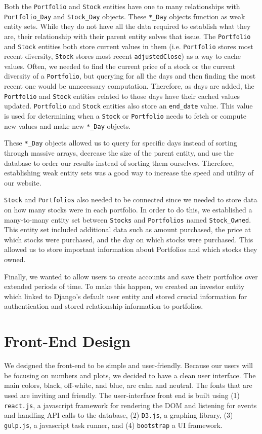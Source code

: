\documentclass{article}
\begin{document}
Both the \texttt{Portfolio} and \texttt{Stock} entities have one to many relationships with \texttt{Portfolio\_Day} and \texttt{Stock\_Day} objects. These \texttt{*\_Day} objects function as weak entity sets. While they do not have all the data required to establish what they are, their relationship with their parent entity solves that issue. The \texttt{Portfolio} and \texttt{Stock} entities both store current values in them (i.e. \texttt{Portfolio} stores most recent diversity, \texttt{Stock} stores most recent \texttt{adjustedClose}) as a way to cache values. Often, we needed to find the current price of a stock or the current diversity of a \texttt{Portfolio}, but querying for all the days and then finding the most recent one would be unnecessary computation. Therefore, as days are added, the \texttt{Portfolio} and \texttt{Stock} entities related to those days have their cached values updated.  \texttt{Portfolio} and \texttt{Stock} entities also store an \texttt{end\_date} value.  This value is used for determining when a \texttt{Stock} or \texttt{Portfolio} needs to fetch or compute new values and make new \texttt{*\_Day} objects.  

These \texttt{*\_Day} objects allowed us to query for specific days instead of sorting through massive arrays, decrease the size of the parent entity, and use the database to order our results instead of sorting them ourselves.  Therefore, establishing weak entity sets was a good way to increase the speed and utility of our website.

\texttt{Stock} and \texttt{Portfolios} also needed to be connected since we needed to store data on how many stocks were in each portfolio.  In order to do this, we established a many-to-many entity set between \texttt{Stocks} and \texttt{Portfolios} named \texttt{Stock\_Owned}.  This entity set included additional data such as amount purchased, the price at which stocks were purchased, and the day on which stocks were purchased.  This allowed us to store important information about Portfolios and which stocks they owned.

Finally, we wanted to allow users to create accounts and save their portfolios over extended periods of time.  To make this happen, we created an investor entity which linked to Django’s default user entity and stored crucial information for authentication and stored relationship information to portfolios.


\section{Front-End Design} \label{sec:fe}
We designed the front-end to be simple and user-friendly. Because our users will be focusing on numbers and plots, we decided to have a clean user interface. The main colors, black, off-white, and blue, are calm and neutral. The fonts that are used are inviting and friendly. The user-interface front end is built using (1) \texttt{react.js}, a javascript framework for rendering the DOM and listening for events and handling API calls to the database, (2) \texttt{D3.js}, a graphing library, (3) \texttt{gulp.js}, a javascript task runner, and (4) \texttt{bootstrap} a UI framework.
\end{document}
